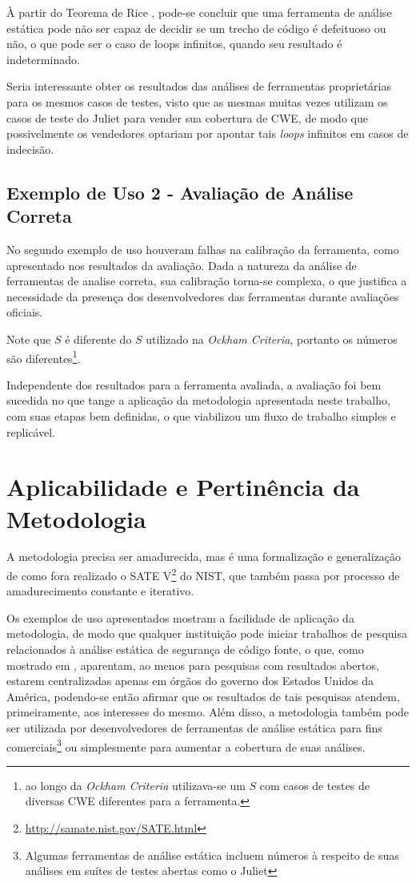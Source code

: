 À partir do Teorema de Rice \cite{rice}, pode-se concluir que uma ferramenta de análise estática pode não ser capaz de decidir se um trecho de código é defeituoso ou não, o que pode ser o caso de loops infinitos, quando seu resultado é indeterminado.

Seria interessante obter os resultados das análises de ferramentas proprietárias para os mesmos casos de testes, visto que as mesmas muitas vezes utilizam os casos de teste do Juliet para vender sua cobertura de CWE, de modo que possivelmente os vendedores optariam por apontar tais \textit{loops} infinitos em casos de indecisão.

\subsection*{Exemplo de Uso 2 - Avaliação de Análise Correta}

No segundo exemplo de uso houveram falhas na calibração da ferramenta, como apresentado nos resultados da avaliação. Dada a natureza da análise de ferramentas de analise correta, sua calibração torna-se complexa, o que justifica a necessidade da presença dos desenvolvedores das ferramentas durante avaliações oficiais.

Note que $S$ é diferente do $S$ utilizado na \textit{Ockham Criteria}, portanto os números são diferentes\footnote{ao longo da \textit{Ockham Criteria} utilizava-se um $S$ com casos de testes de diversas CWE diferentes para a ferramenta.}.

Independente dos resultados para a ferramenta avaliada, a avaliação foi bem sucedida no que tange a aplicação da metodologia apresentada neste trabalho, com suas etapas bem definidas, o que viabilizou um fluxo de trabalho simples e replicável. 

\section*{Aplicabilidade e Pertinência da Metodologia}

A metodologia precisa ser amadurecida, mas é uma formalização e generalização de como fora realizado o SATE V\footnote{\url{http://samate.nist.gov/SATE.html}} do NIST, que também passa por processo de amadurecimento constante e iterativo.

Os exemplos de uso apresentados mostram a facilidade de aplicação da metodologia, de modo que qualquer instituição pode iniciar trabalhos de pesquisa relacionados à análise estática de segurança de código fonte, o que, como mostrado em , aparentam, ao menos para pesquisas com resultados abertos, estarem centralizadas apenas em órgãos do governo dos Estados Unidos da América, podendo-se então afirmar que os resultados de tais pesquisas atendem, primeiramente, aos interesses do mesmo. Além disso, a metodologia também pode ser utilizada por desenvolvedores de ferramentas de análise estática para fins comerciais\footnote{Algumas ferramentas de análise estática incluem números à respeito de suas análises em suítes de testes abertas como o Juliet} ou simplesmente para aumentar a cobertura de suas análises.

